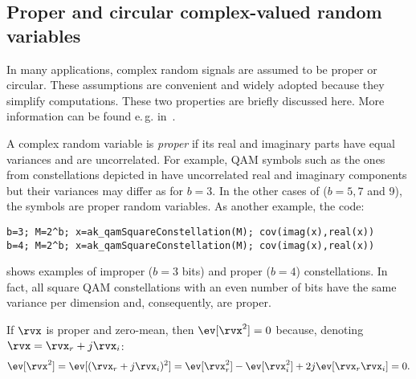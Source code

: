 \ifml  %
\else
\subsection{Proper and circular complex-valued random variables}
\label{sec:properCircularRV}

In many applications, 
complex random signals are assumed to be proper or circular. These assumptions
are convenient and widely adopted because they simplify computations.
These two properties are briefly discussed here. More information 
can be found e.\,g. in~\cite{Neeser93,Schreier10,Adali11,Proakis07}.

A complex random variable is \emph{proper} if
its real and imaginary parts have equal variances and are uncorrelated.
For example, QAM symbols such as the ones from constellations depicted in 
have uncorrelated real and imaginary components but  their variances may differ as for $b=3$.
In the other cases of  ($b=5, 7$ and 9), the
symbols are proper random variables. As another example, the code:
\begin{lstlisting}
b=3; M=2^b; x=ak_qamSquareConstellation(M); cov(imag(x),real(x))
b=4; M=2^b; x=ak_qamSquareConstellation(M); cov(imag(x),real(x))
\end{lstlisting}
shows examples of improper ($b=3$ bits) and proper ($b=4$) constellations. In fact, 
all square QAM constellations with an even number of bits have the same
variance per dimension and, consequently, are proper.

If $\rvx$ is proper and zero-mean, then $\ev[\rvx^2] = 0$  because, denoting $\rvx = \rvx_r + j \rvx_i$:
\begin{equation}
\ev[\rvx^2] = \ev[(\rvx_r + j \rvx_i)^2] = \ev[\rvx_r^2] - \ev[\rvx_i^2] + 2j \ev[\rvx_r \rvx_i] = 0.
\label{eq:expectedSquareProperRV}
\end{equation}

